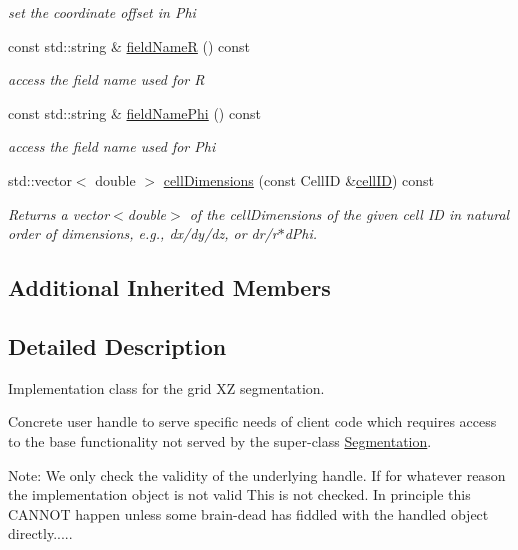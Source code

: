\begin{DoxyCompactItemize}
\begin{DoxyCompactList}\small\item\em set the coordinate offset in Phi \end{DoxyCompactList}\item 
const std\+::string \& \hyperlink{class_d_d4hep_1_1_geometry_1_1_polar_grid_r_phi_aeb6135457952d23b9033cc1537d76376}{field\+NameR} () const
\begin{DoxyCompactList}\small\item\em access the field name used for R \end{DoxyCompactList}\item 
const std\+::string \& \hyperlink{class_d_d4hep_1_1_geometry_1_1_polar_grid_r_phi_aae955b9e6518f31977913c8f1f25016a}{field\+Name\+Phi} () const
\begin{DoxyCompactList}\small\item\em access the field name used for Phi \end{DoxyCompactList}\item 
std\+::vector$<$ double $>$ \hyperlink{class_d_d4hep_1_1_geometry_1_1_polar_grid_r_phi_aa1779188be4c7a15805f56700bbdfa78}{cell\+Dimensions} (const Cell\+ID \&\hyperlink{class_d_d4hep_1_1_geometry_1_1_polar_grid_r_phi_a046347fac14370939120a716b606d5cb}{cell\+ID}) const
\begin{DoxyCompactList}\small\item\em Returns a vector$<$double$>$ of the cell\+Dimensions of the given cell ID in natural order of dimensions, e.\+g., dx/dy/dz, or dr/r$\ast$d\+Phi. \end{DoxyCompactList}\end{DoxyCompactItemize}
\subsection*{Additional Inherited Members}


\subsection{Detailed Description}
Implementation class for the grid XZ segmentation. 

Concrete user handle to serve specific needs of client code which requires access to the base functionality not served by the super-\/class \hyperlink{class_d_d4hep_1_1_geometry_1_1_segmentation}{Segmentation}.

Note\+: We only check the validity of the underlying handle. If for whatever reason the implementation object is not valid This is not checked. In principle this C\+A\+N\+N\+OT happen unless some brain-\/dead has fiddled with the handled object directly.....

